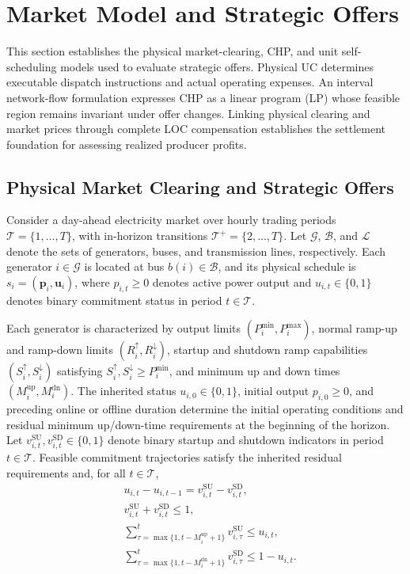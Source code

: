\documentclass[journal]{IEEEtran}
\newcommand{\bp}{\bm p}
\newcommand{\bu}{\bm u}
\newcommand{\Pmin}{P^{\min}}
\newcommand{\Pmax}{P^{\max}}
\newcommand{\Rup}{R^{\uparrow}}
\newcommand{\Rdn}{R^{\downarrow}}
\newcommand{\Sup}{S^{\uparrow}}
\newcommand{\Sdn}{S^{\downarrow}}
\newcommand{\Mup}{M^{\mathrm{up}}}
\newcommand{\Mdn}{M^{\mathrm{dn}}}
\begin{document}
\section{Market Model and Strategic Offers}
\label{sec:model}

This section establishes the physical market-clearing, CHP, and unit self-scheduling models used to evaluate strategic offers. Physical UC determines executable dispatch instructions and actual operating expenses. An interval network-flow formulation expresses CHP as a linear program (LP) whose feasible region remains invariant under offer changes. Linking physical clearing and market prices through complete LOC compensation establishes the settlement foundation for assessing realized producer profits.

\subsection{Physical Market Clearing and Strategic Offers}
Consider a day-ahead electricity market over hourly trading periods $\mathcal{T}\!=\!\{1,\ldots,T\}$, with in-horizon transitions $\mathcal{T}^{+}\!=\!\{2,\ldots,T\}$. Let $\mathcal{G}$, $\mathcal{B}$, and $\mathcal{L}$ denote the sets of generators, buses, and transmission lines, respectively. Each generator $i\!\in\!\mathcal{G}$ is located at bus $b(i)\!\in\!\mathcal{B}$, and its physical schedule is $s_i\!\!=\!\!(\bp_i,\bu_i)$, where $p_{i,t}\!\!\ge\!\! 0$ denotes active power output and $u_{i,t}\!\in\!\{0,1\}$ denotes binary commitment status in period $t\!\in\!\mathcal{T}$.

Each generator is characterized by output limits $(\Pmin_i,\Pmax_i)$, normal ramp-up and ramp-down limits $(\Rup_i,\Rdn_i)$, startup and shutdown ramp capabilities $(\Sup_i,\Sdn_i)$ satisfying $\Sup_i,\Sdn_i\ge\Pmin_i$, and minimum up and down times $(\Mup_i,\Mdn_i)$. The inherited status $u_{i,0}\in\{0,1\}$, initial output $p_{i,0}\ge 0$, and preceding online or offline duration determine the initial operating conditions and residual minimum up/down-time requirements at the beginning of the horizon. Let $v_{i,t}^{\mathrm{SU}},v_{i,t}^{\mathrm{SD}}\in\{0,1\}$ denote binary startup and shutdown indicators in period $t\in\mathcal{T}$. Feasible commitment trajectories satisfy the inherited residual requirements and, for all $t\in\mathcal{T}$,
\begin{subequations}\label{eq:commitment}
\begin{align}
 &u_{i,t}-u_{i,t-1} = v_{i,t}^{\mathrm{SU}}-v_{i,t}^{\mathrm{SD}},\\
 &v_{i,t}^{\mathrm{SU}}+v_{i,t}^{\mathrm{SD}} \le 1,\\
 &\sum\nolimits_{\tau=\max\{1,t-\Mup_i+1\}}^{t} v_{i,\tau}^{\mathrm{SU}} \le u_{i,t},\\
 &\sum\nolimits_{\tau=\max\{1,t-\Mdn_i+1\}}^{t} v_{i,\tau}^{\mathrm{SD}} \le 1-u_{i,t}.
\end{align}
\end{subequations}
\end{document}
